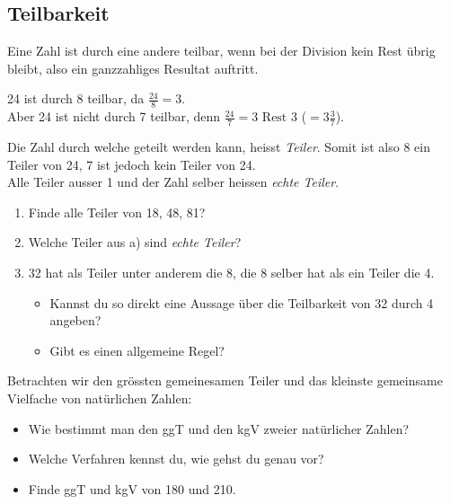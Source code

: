 \subsection{Teilbarkeit}
Eine Zahl ist durch eine andere teilbar, wenn bei der Division kein Rest übrig bleibt, also ein ganzzahliges Resultat auftritt.
\begin{ex} 24 ist durch 8 teilbar, da $\tfrac{24}{8}=3$.\\ Aber 24 ist nicht durch 7 teilbar, denn $\tfrac{24}{7}=3 \text{ Rest 3}$ ($=3 \tfrac{3}{7}$).
\end{ex}
Die Zahl durch welche geteilt werden kann, heisst \emph{Teiler}. Somit ist also 8 ein Teiler von 24, 7 ist jedoch kein Teiler von 24. \\Alle Teiler ausser 1 und der Zahl selber heissen \emph{echte Teiler}.
\begin{aufgabe}[Teilbarkeit]
\begin{center}
\begin{enumerate}[label=\alph*)]
\item Finde alle Teiler von 18, 48, 81?
\item Welche Teiler aus a) sind \emph{echte Teiler}?
\item 32 hat als Teiler unter anderem die 8, die 8 selber hat als ein Teiler die 4.\\
\begin{itemize} \item Kannst du so direkt eine Aussage über die Teilbarkeit von 32 durch 4 angeben? \item Gibt es einen allgemeine Regel?
\end{itemize}
\end{enumerate}
\end{center}
\end{aufgabe}
Betrachten wir den grössten gemeinesamen Teiler und das kleinste gemeinsame Vielfache von natürlichen Zahlen:
\begin{aufgabe}
\begin{itemize}
\item Wie bestimmt man den ggT und den kgV zweier natürlicher Zahlen? 
\item Welche Verfahren kennst du, wie gehst du genau vor?
\item Finde ggT und kgV von 180 und 210.
\end{itemize}
\end{aufgabe}

